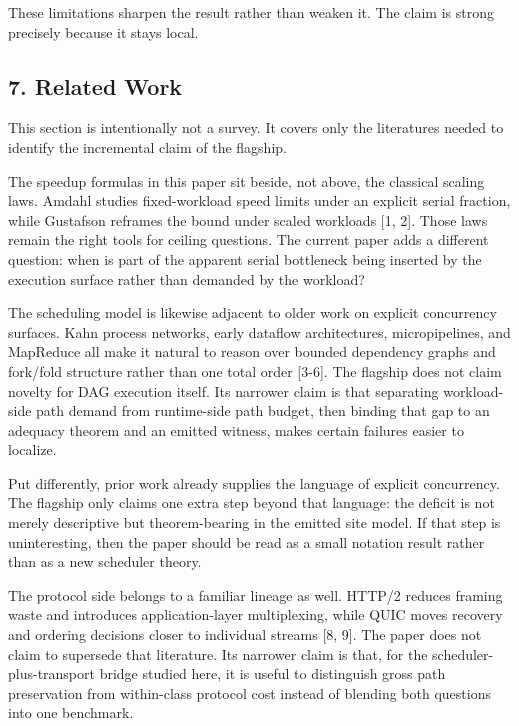 \documentclass[
  11pt,
]{article}
\begin{document}
These limitations sharpen the result rather than weaken it. The claim is
strong precisely because it stays local.

\subsection{7. Related Work}\label{related-work}

This section is intentionally not a survey. It covers only the
literatures needed to identify the incremental claim of the flagship.

The speedup formulas in this paper sit beside, not above, the classical
scaling laws. Amdahl studies fixed-workload speed limits under an
explicit serial fraction, while Gustafson reframes the bound under
scaled workloads {[}1, 2{]}. Those laws remain the right tools for
ceiling questions. The current paper adds a different question: when is
part of the apparent serial bottleneck being inserted by the execution
surface rather than demanded by the workload?

The scheduling model is likewise adjacent to older work on explicit
concurrency surfaces. Kahn process networks, early dataflow
architectures, micropipelines, and MapReduce all make it natural to
reason over bounded dependency graphs and fork/fold structure rather
than one total order {[}3-6{]}. The flagship does not claim novelty for
DAG execution itself. Its narrower claim is that separating
workload-side path demand from runtime-side path budget, then binding
that gap to an adequacy theorem and an emitted witness, makes certain
failures easier to localize.

Put differently, prior work already supplies the language of explicit
concurrency. The flagship only claims one extra step beyond that
language: the deficit is not merely descriptive but theorem-bearing in
the emitted site model. If that step is uninteresting, then the paper
should be read as a small notation result rather than as a new scheduler
theory.

The protocol side belongs to a familiar lineage as well. HTTP/2 reduces
framing waste and introduces application-layer multiplexing, while QUIC
moves recovery and ordering decisions closer to individual streams {[}8,
9{]}. The paper does not claim to supersede that literature. Its
narrower claim is that, for the scheduler-plus-transport bridge studied
here, it is useful to distinguish gross path preservation from
within-class protocol cost instead of blending both questions into one
benchmark.
\end{document}

